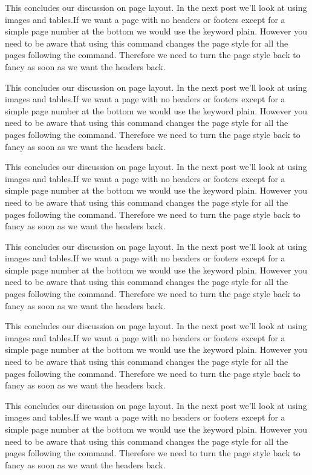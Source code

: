 This concludes our discussion on page layout. In the next post we'll look at using images and tables.If we want a page with no headers or footers except for a simple page number at the bottom we would use the keyword plain. However you need to be aware that using this command changes the page style for all the pages following the command. Therefore we need to turn the page style back to fancy as soon as we want the headers back.

This concludes our discussion on page layout. In the next post we'll look at using images and tables.If we want a page with no headers or footers except for a simple page number at the bottom we would use the keyword plain. However you need to be aware that using this command changes the page style for all the pages following the command. Therefore we need to turn the page style back to fancy as soon as we want the headers back.

This concludes our discussion on page layout. In the next post we'll look at using images and tables.If we want a page with no headers or footers except for a simple page number at the bottom we would use the keyword plain. However you need to be aware that using this command changes the page style for all the pages following the command. Therefore we need to turn the page style back to fancy as soon as we want the headers back.

This concludes our discussion on page layout. In the next post we'll look at using images and tables.If we want a page with no headers or footers except for a simple page number at the bottom we would use the keyword plain. However you need to be aware that using this command changes the page style for all the pages following the command. Therefore we need to turn the page style back to fancy as soon as we want the headers back.

This concludes our discussion on page layout. In the next post we'll look at using images and tables.If we want a page with no headers or footers except for a simple page number at the bottom we would use the keyword plain. However you need to be aware that using this command changes the page style for all the pages following the command. Therefore we need to turn the page style back to fancy as soon as we want the headers back.

This concludes our discussion on page layout. In the next post we'll look at using images and tables.If we want a page with no headers or footers except for a simple page number at the bottom we would use the keyword plain. However you need to be aware that using this command changes the page style for all the pages following the command. Therefore we need to turn the page style back to fancy as soon as we want the headers back.

